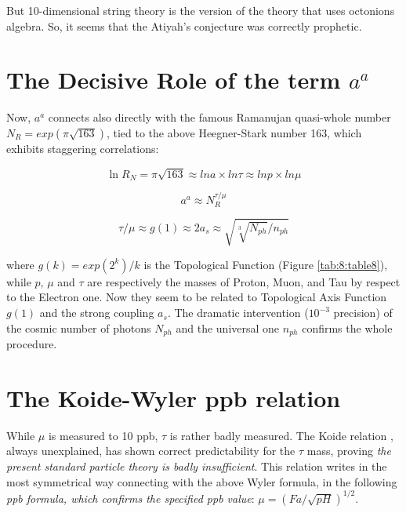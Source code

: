 \documentclass[a4paper,9pt]{article}
\begin{document}
But 10-dimensional string theory is the version of the theory that uses octonions algebra. So, it seems that the Atiyah's conjecture was correctly prophetic.








\section{The Decisive Role of the term $a^a$ }





Now, $a^a$ connects also directly with the famous Ramanujan quasi-whole number $N_R = exp(\pi \sqrt{163})$, tied to the above Heegner-Stark number 163, which exhibits staggering correlations:



\begin{equation}
\ln{R_N} = \pi \sqrt{163}  \approx lna \times ln\tau  \approx  lnp \times ln\mu
\end{equation}

\begin{equation}
a^a \approx N_R^{\tau/\mu} 
\end{equation}

\begin{equation}
\tau/\mu   \approx g(1) \approx  2a_s \approx \sqrt{\sqrt[3]{N_{ph}}/n_{ph}}
\end{equation}

where $g(k) = exp(2^k)/k$ is the Topological Function (Figure \ref{tab:8:table8}), while $p$, $\mu$ and $\tau$ are respectively the masses of Proton, Muon, and Tau by respect to the Electron one.  Now they seem to be related to Topological Axis Function $g(1)$ and the strong coupling $a_s$. The dramatic intervention ($10^{-3}$ precision) of the cosmic number of photons $N_{ph}$ and the universal one $n_{ph}$ confirms the whole procedure.









\section {The Koide-Wyler ppb relation}

While $\mu$ is measured to 10 ppb, $\tau$ is rather badly measured. The Koide relation \cite{Koide}, always unexplained, has shown correct predictability for the $\tau$ mass, proving \textit{the present standard particle theory is badly insufficient}. This relation writes in the most symmetrical way connecting with the above Wyler formula, in the following \textit{ppb formula, which confirms the specified ppb value}: $\mu = (Fa/\sqrt{pH})^{1/2}$\cite{Sanchez}.
\end{document}
